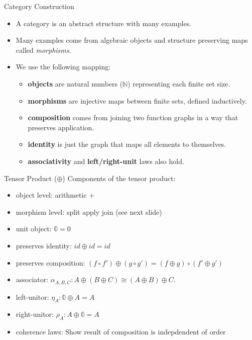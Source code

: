 \documentclass[aspectratio=169,16pt]{beamer}
\begin{document}
\begin{frame}{Category Construction}
  \begin{itemize}
    \item A category is an abstract structure with many examples.
    \item Many examples come from algebraic objects and
      structure preserving maps called \textit{morphisms}.
    \item We use the following mapping:
    \begin{itemize}
    \item \textbf{objects} are natural numbers ($\mathbb{N}$) representing each
      finite set size.
    \item \textbf{morphisms} are injective maps between finite sets, defined
      inductively.
    \item \textbf{composition} comes from joining two function graphs in a way
      that preserves application.
    \item \textbf{identity} is just the graph that maps all elements to themselves.
    \item \textbf{associativity} and \textbf{left/right-unit} laws also hold.
    \end{itemize}
  \end{itemize}
\end{frame}

\begin{frame}{Tensor Product ($\oplus$)}
  Components of the tensor product:
  \begin{itemize}
  \item object level: arithmetic +
  \item morphism level: split \to apply \to join (see next slide)
  \item unit object: $𝟘 = 0$
  \item preserves identity: $\mathit{id} \oplus \mathit{id} = \mathit{id}$
  \item preserves composition: $(f \circ f') \oplus (g \circ g') = (f \oplus g) \circ (f' \oplus g')$
  \item associator: $\alpha_{A,B,C} : A \oplus (B \oplus C) \cong (A \oplus B) \oplus C$. 
  \item left-unitor: $\eta_{A} : 𝟘 \oplus A = A$
  \item right-unitor: $\rho_{A} : A \oplus 𝟘 = A$
  \item coherence laws: Show result of composition is indepdendent of order
  \end{itemize}
\end{frame}
\end{document}
